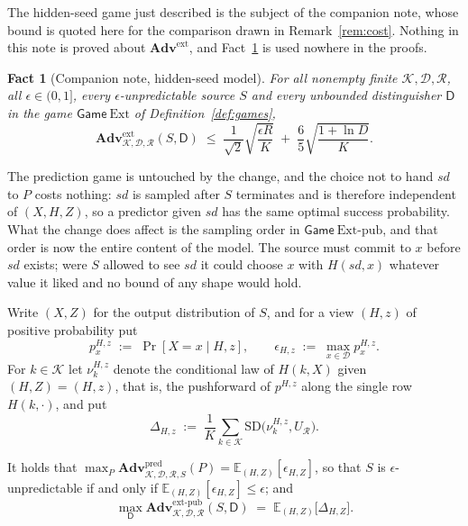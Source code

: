 \documentclass{conjura-solution}
\newcommand{\Adv}{\mathbf{Adv}}
\newcommand{\Gm}{\mathsf{Game}}
\newcommand{\Ext}{\mathrm{Ext}}
\newcommand{\Extp}{\mathrm{Ext}\text{-}\mathrm{pub}}
\newcommand{\pred}{\mathrm{pred}}
\newcommand{\ext}{\mathrm{ext}}
\newcommand{\extp}{\mathrm{ext}\text{-}\mathrm{pub}}
\newcommand{\sd}{\mathit{sd}}
\newcommand{\SD}{\mathrm{SD}}
\newcommand{\calK}{\mathcal{K}}
\newcommand{\calD}{\mathcal{D}}
\newcommand{\calR}{\mathcal{R}}
\theoremstyle{cjplain}
\newtheorem{fact}{Fact}
\begin{document}
The hidden-seed game just described is the subject of the companion note, whose bound is quoted
here for the comparison drawn in Remark~\ref{rem:cost}. Nothing in this note is proved about
$\Adv^{\ext}$, and Fact~\ref{fact:hidden} is used nowhere in the proofs.

\begin{fact}[Companion note, hidden-seed model]\label{fact:hidden}
For all nonempty finite $\calK, \calD, \calR$, all $\epsilon \in (0,1]$, every
$\epsilon$-unpredictable source $S$ and every unbounded distinguisher $\mathsf{D}$ in the game
$\Gm\ \Ext$ of Definition~\ref{def:games},
\[
  \Adv^{\ext}_{\calK,\calD,\calR}(S,\mathsf{D})
  \;\le\; \frac{1}{\sqrt{2}}\sqrt{\frac{\epsilon R}{K}}
       \;+\; \frac{6}{5}\sqrt{\frac{1 + \ln D}{K}} .
\]
\end{fact}

The prediction game is untouched by the change, and the choice not to hand $\sd$ to $P$ costs
nothing: $\sd$ is sampled after $S$ terminates and is therefore independent of $(X,H,Z)$, so a
predictor given $\sd$ has the same optimal success probability. What the change does affect is
the sampling order in $\Gm\ \Extp$, and that order is now the entire content of the model. The
source must commit to $x$ before $\sd$ exists; were $S$ allowed to see $\sd$ it could choose $x$
with $H(\sd,x)$ whatever value it liked and no bound of any shape would hold.

Write $(X,Z)$ for the output distribution of $S$, and for a view $(H,z)$ of positive probability put
\[
  p^{H,z}_{x} \;:=\; \Pr[X = x \mid H, z] ,
  \qquad
  \epsilon_{H,z} \;:=\; \max_{x \in \calD} p^{H,z}_{x} .
\]
For $k \in \calK$ let $\nu^{H,z}_{k}$ denote the conditional law of $H(k, X)$ given $(H,Z) = (H,z)$,
that is, the pushforward of $p^{H,z}$ along the single row $H(k,\cdot)$, and put
\[
  \Delta_{H,z} \;:=\; \frac{1}{K}\sum_{k \in \calK} \SD\bigl(\nu^{H,z}_{k}, U_{\calR}\bigr).
\]

\begin{lemma}\label{lem:analytic}
It holds that
$\max_{P} \Adv^{\pred}_{\calK,\calD,\calR,S}(P) = \mathbb{E}_{(H,Z)}[\epsilon_{H,Z}]$, so that
$S$ is $\epsilon$-unpredictable if and only if $\mathbb{E}_{(H,Z)}[\epsilon_{H,Z}] \le \epsilon$;
and
\begin{equation}\label{eq:analytic}
  \max_{\mathsf{D}}\Adv^{\extp}_{\calK,\calD,\calR}(S,\mathsf{D})
  \;=\; \mathbb{E}_{(H,Z)}\bigl[\Delta_{H,Z}\bigr] .
\end{equation}
\end{lemma}
\end{document}
